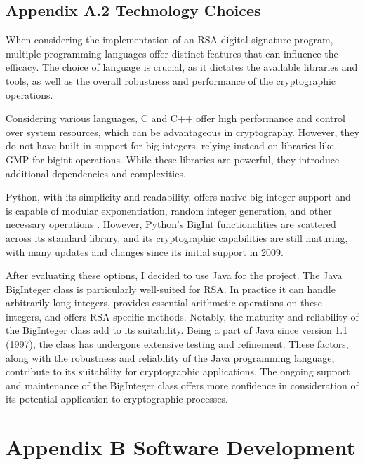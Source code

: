 \documentclass[]{final_report}
\theoremstyle{definition}
\begin{document}
\section{Appendix A.2 Technology Choices}
When considering the implementation of an RSA digital signature program, multiple programming languages offer distinct features that can influence the efficacy. The choice of language is crucial, as it dictates the available libraries and tools, as well as the overall robustness and performance of the cryptographic operations.

Considering various languages, C and C++ offer high performance and control over system resources, which can be advantageous in cryptography. However, they do not have built-in support for big integers, relying instead on libraries like GMP \cite{GMP} for bigint operations. While these libraries are powerful, they introduce additional dependencies and complexities.

Python, with its simplicity and readability, offers native big integer support and is capable of modular exponentiation, random integer generation, and other necessary operations  \cite{python3lib} . However, Python's BigInt functionalities are scattered across its standard library, and its cryptographic capabilities are still maturing, with many updates and changes since its initial support in 2009. 

After evaluating these options, I decided to use Java for the project. The Java BigInteger class \cite{BigIntegerJDK21} is particularly well-suited for RSA. In practice it can handle arbitrarily long integers, provides essential arithmetic operations on these integers, and offers RSA-specific methods. Notably, the maturity and reliability of the BigInteger class add to its suitability. Being a part of Java since version 1.1 (1997), the class has undergone extensive testing and refinement. These factors, along with the robustness and reliability of the Java programming language, contribute to its suitability for cryptographic applications. The ongoing support and maintenance of the BigInteger class offers more confidence in consideration of its potential application to cryptographic processes. 



\chapter{Appendix B Software Development}
\end{document}
